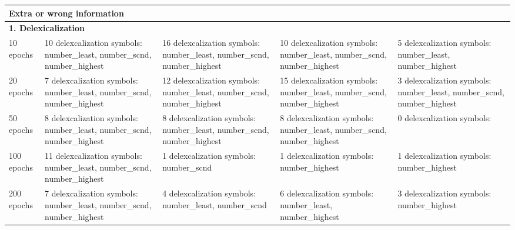 \documentclass[]{article}
\begin{document}
\begin{landscape}
\begin{longtable}{|p{20mm}|p{50mm}|p{50mm}|p{50mm}|p{50mm}|}
        \multicolumn{5}{|l|}{\textbf{Extra or wrong information}  } \\ \hline
        \multicolumn{5}{|l|}{\textbf{1. Delexicalization}  } \\ \hline
    10 epochs &10 delexcalization symbols: number\_least, number\_scnd, number\_highest & 16 delexcalization symbols: number\_least, number\_scnd, number\_highest & 10 delexcalization symbols: number\_least, number\_scnd, number\_highest & 5 delexcalization symbols: number\_least, number\_highest\\ \hline 
20 epochs &7 delexcalization symbols: number\_least, number\_scnd, number\_highest & 12 delexcalization symbols: number\_least, number\_scnd, number\_highest & 15 delexcalization symbols: number\_least, number\_scnd, number\_highest & 3 delexcalization symbols: number\_least, number\_scnd, number\_highest\\ \hline 
50 epochs &8 delexcalization symbols: number\_least, number\_scnd, number\_highest & 8 delexcalization symbols: number\_least, number\_scnd, number\_highest & 8 delexcalization symbols: number\_least, number\_scnd, number\_highest & 0 delexcalization symbols: \\ \hline 
100 epochs &11 delexcalization symbols: number\_least, number\_scnd, number\_highest & 1 delexcalization symbols: number\_scnd & 1 delexcalization symbols: number\_highest & 1 delexcalization symbols: number\_highest\\ \hline 
200 epochs &7 delexcalization symbols: number\_least, number\_scnd, number\_highest & 4 delexcalization symbols: number\_least, number\_scnd & 6 delexcalization symbols: number\_least, number\_highest & 3 delexcalization symbols: number\_highest\\ \hline 


\end{longtable}
\end{landscape}
\end{document}
